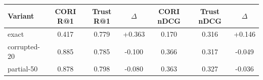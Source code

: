 \begin{tabular}{l ccc ccc}
\toprule
Variant & CORI R@1 & Trust R@1 & $\Delta$ & CORI nDCG & Trust nDCG & $\Delta$ \\
\midrule
exact & 0.417 & 0.779 & +0.363 & 0.170 & 0.316 & +0.146 \\
corrupted-20 & 0.885 & 0.785 & -0.100 & 0.366 & 0.317 & -0.049 \\
partial-50 & 0.878 & 0.798 & -0.080 & 0.363 & 0.327 & -0.036 \\
\bottomrule
\end{tabular}
